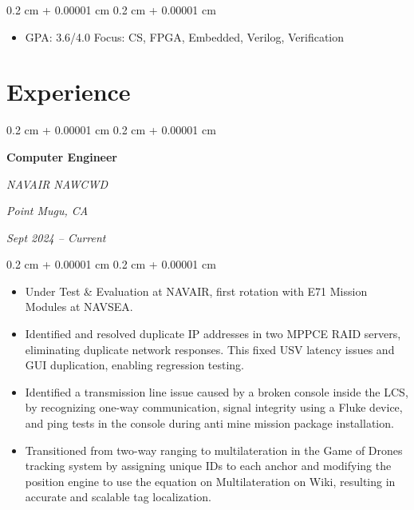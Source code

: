 \documentclass[10pt, letterpaper]{article}
\newenvironment{highlights}{
    \begin{itemize}[
        topsep=0.10 cm,
        parsep=0.10 cm,
        partopsep=0pt,
        itemsep=0pt,
        leftmargin=0.4 cm + 10pt
    ]
}{
    \end{itemize}
} %
\newenvironment{onecolentry}{
    \begin{adjustwidth}{
        0.2 cm + 0.00001 cm
    }{
        0.2 cm + 0.00001 cm
    }
}{
    \end{adjustwidth}
} %
\newenvironment{twocolentry}[2][]{
    \onecolentry
    \def\secondColumn{#2}
    \setcolumnwidth{\fill, 4.5 cm}
    \begin{paracol}{2}
}{
    \switchcolumn \raggedleft \secondColumn
    \end{paracol}
    \endonecolentry
} %
\begin{document}
        \vspace{0.10 cm}
        \begin{onecolentry}
            \begin{highlights}
                \item GPA: 3.6/4.0 Focus: CS, FPGA, Embedded, Verilog, Verification
            \end{highlights}
        \end{onecolentry}
    
    \section{Experience}
        
        \begin{twocolentry}{
        \textit{Point Mugu, CA}    
            
        \textit{Sept 2024 – Current}}
            \textbf{Computer Engineer}
            
            \textit{NAVAIR NAWCWD}
        \end{twocolentry}

        \vspace{0.10 cm}
        \begin{onecolentry}
            \begin{highlights}
                \item Under Test \& Evaluation at NAVAIR, first rotation with E71 Mission Modules at NAVSEA.
                \item Identified and resolved duplicate IP addresses in two MPPCE RAID servers, eliminating duplicate network responses. This fixed USV latency issues and GUI duplication, enabling regression testing.
                \item Identified a transmission line issue caused by a broken console inside the LCS, by recognizing one-way communication, signal integrity using a Fluke device, and ping tests in the console during anti mine mission package installation. 
                \item Transitioned from two-way ranging to multilateration in the Game of Drones tracking system by assigning unique IDs to each anchor and modifying the position engine to use the equation on Multilateration on Wiki, resulting in accurate and scalable tag localization.
            \end{highlights}
        \end{onecolentry}
\end{document}
